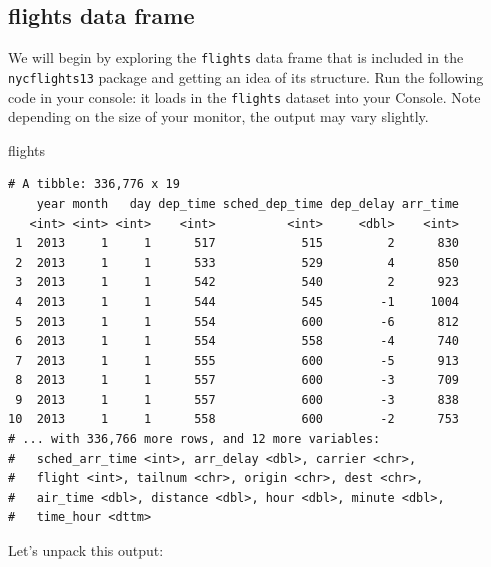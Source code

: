 \documentclass[12pt,]{krantz}
\makeatletter
\newenvironment{Shaded}{\begin{snugshade}}{\end{snugshade}}
\newcommand{\NormalTok}[1]{#1}
\newenvironment{kframe}{%
\medskip{}
\setlength{\fboxsep}{.8em}
 \def\at@end@of@kframe{}%
 \ifinner\ifhmode%
  \def\at@end@of@kframe{\end{minipage}}%
  \begin{minipage}{\columnwidth}%
 \fi\fi%
 \def\FrameCommand##1{\hskip\@totalleftmargin \hskip-\fboxsep
 \colorbox{shadecolor}{##1}\hskip-\fboxsep
     \hskip-\linewidth \hskip-\@totalleftmargin \hskip\columnwidth}%
 \MakeFramed {\advance\hsize-\width
   \@totalleftmargin\z@ \linewidth\hsize
   \@setminipage}}%
 {\par\unskip\endMakeFramed%
 \at@end@of@kframe}
\renewenvironment{Shaded}{\begin{kframe}}{\end{kframe}}
\makeatother
\begin{document}
\subsection{flights data frame}\label{flights-data-frame}

We will begin by exploring the \texttt{flights} data frame that is
included in the \texttt{nycflights13} package and getting an idea of its
structure. Run the following code in your console: it loads in the
\texttt{flights} dataset into your Console. Note depending on the size
of your monitor, the output may vary slightly.

\begin{Shaded}
\begin{Highlighting}[]
\NormalTok{flights}
\end{Highlighting}
\end{Shaded}

\begin{verbatim}
# A tibble: 336,776 x 19
    year month   day dep_time sched_dep_time dep_delay arr_time
   <int> <int> <int>    <int>          <int>     <dbl>    <int>
 1  2013     1     1      517            515         2      830
 2  2013     1     1      533            529         4      850
 3  2013     1     1      542            540         2      923
 4  2013     1     1      544            545        -1     1004
 5  2013     1     1      554            600        -6      812
 6  2013     1     1      554            558        -4      740
 7  2013     1     1      555            600        -5      913
 8  2013     1     1      557            600        -3      709
 9  2013     1     1      557            600        -3      838
10  2013     1     1      558            600        -2      753
# ... with 336,766 more rows, and 12 more variables:
#   sched_arr_time <int>, arr_delay <dbl>, carrier <chr>,
#   flight <int>, tailnum <chr>, origin <chr>, dest <chr>,
#   air_time <dbl>, distance <dbl>, hour <dbl>, minute <dbl>,
#   time_hour <dttm>
\end{verbatim}

Let's unpack this output:
\end{document}
